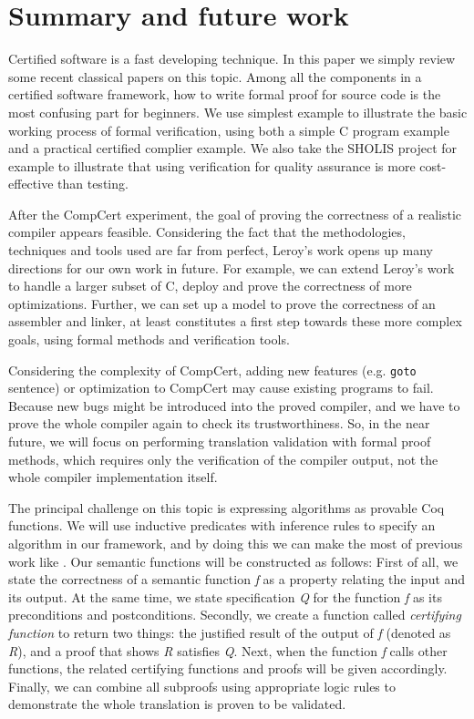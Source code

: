 \documentclass[10pt, conference, compsocconf]{IEEEtran}
\begin{document}
\section{Summary and future work}

Certified software is a fast developing technique. In this paper we simply review some recent classical papers on this topic. Among all the components in a certified software framework, how to write formal proof for source code is the most confusing part for beginners. We use simplest example to illustrate the basic working process of formal verification, using both a simple C program example and a practical certified complier example. We also take the SHOLIS project for example to illustrate that using verification for quality assurance is more cost-effective than testing.

After the CompCert experiment, the goal of proving the correctness of a realistic compiler appears feasible. Considering the fact that the methodologies, techniques and tools used are far from perfect, Leroy's work opens up many directions for our own work in future. For example, we can extend Leroy's work to handle a larger subset of C, deploy and prove the correctness of more optimizations. Further, we can set up a model to prove the correctness of an assembler and linker, at least constitutes a first step towards these more complex goals, using formal methods and verification tools. 

Considering the complexity of CompCert, adding new features (e.g. \texttt{goto} sentence) or optimization to CompCert may cause existing programs to fail. Because new bugs might be introduced into the proved compiler, and we have to prove the whole compiler again to check its trustworthiness. So, in the near future, we will focus on performing translation validation \cite{translation} with formal proof methods, which requires only the verification of the compiler output, not the whole compiler implementation itself. 

The principal challenge on this topic is expressing algorithms as provable Coq functions. We will use inductive predicates with inference rules to specify an algorithm in our framework, and by doing this we can make the most of previous work like \cite{validator}. Our semantic functions will be constructed as follows: First of all, we state the correctness of a semantic function \emph{f} as a property relating the input and its output. At the same time, we state specification \emph{Q} for the function \emph{f} as its preconditions and postconditions. Secondly, we create a function called \emph{certifying function} to return two things: the justified result of the output of \emph{f} (denoted as \emph{R}), and a proof that shows \emph{R} satisfies \emph{Q}. Next, when the function \emph{f} calls other functions, the related certifying functions and proofs will be given accordingly. Finally, we can combine all subproofs using appropriate logic rules  to demonstrate the whole translation is proven to be validated.
\end{document}

